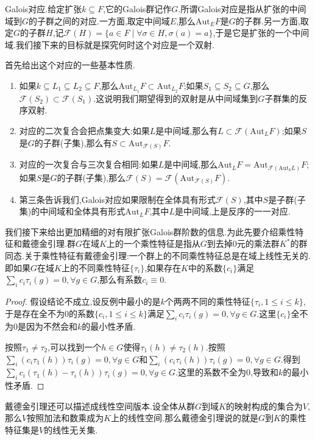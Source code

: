 Galois对应.给定扩张$k\subseteq F$,它的Galois群记作$G$.所谓Galois对应是指从扩张的中间域到$G$的子群之间的对应.一方面,取定中间域$E$,那么$\mathrm{Aut}_EF$是$G$的子群.另一方面,取定$G$的子群$H$,记$\mathscr{F}(H)=\{a\in F\mid\forall\sigma\in H,\sigma(a)=a\}$,于是它是扩张的一个中间域.我们接下来的目标就是探究何时这个对应是一个双射.

首先给出这个对应的一些基本性质.
\begin{enumerate}
	\item 如果$k\subseteq L_1\subseteq L_2\subseteq F$,那么$\mathrm{Aut}_{L_1}F\subset\mathrm{Aut}_{L_2}F$;如果$S_1\subseteq S_2\subseteq G$,那么$\mathscr{F}(S_2)\subset\mathscr{F}(S_1)$.这说明我们期望得到的双射是从中间域集到$G$子群集的反序双射.
	\item 对应的二次复合会把点集变大:如果$L$是中间域,那么有$L\subset\mathscr{F}(\mathrm{Aut}_LF)$;如果$S$是$G$的子群(子集),那么有$S\subset\mathrm{Aut}_{\mathscr{F}(S)}F$.
	\item 对应的一次复合与三次复合相同:如果$L$是中间域,那么$\mathrm{Aut}_LF=\mathrm{Aut}_{\mathscr{F}(\mathrm{Aut}_kL)}F$;如果$S$是$G$的子群(子集),那么$\mathscr{F}(S)=\mathscr{F}(\mathrm{Aut}_{\mathscr{F}(S)}F)$.
	\item 第三条告诉我们,Galois对应如果限制在全体具有形式$\mathscr{F}(S)$,其中$S$是子群(子集)的中间域和全体具有形式$\mathrm{Aut}_LF$,其中$L$是中间域,上是反序的一一对应.
\end{enumerate}

我们接下来给出更加精细的对有限扩张Galois群阶数的信息.为此先要介绍乘性特征和戴德金引理.群$G$在域$K$上的一个乘性特征是指从$G$到去掉0元的乘法群$K^*$的群同态.关于乘性特征有戴德金引理:一个群上的不同乘性特征总是在域上线性无关的.即如果$G$在域$K$上的不同乘性特征$\{\tau_i\}$,如果存在$K$中的系数$\{c_i\}$满足$\sum_i c_i\tau_i(g)=0,\forall g\in G$,那么有系数$c_i\equiv0$.
\begin{proof}
	
	假设结论不成立,设反例中最小的是$k$个两两不同的乘性特征$\{\tau_i,1\le i\le k\}$,于是存在全不为0的系数$\{c_i,1\le i\le k\}$满足$\sum_ic_i\tau_i(g)=0,\forall g\in G$.这里$\{c_i\}$全不为0是因为不然会和$k$的最小性矛盾.
	
	按照$\tau_1\not=\tau_2$,可以找到一个$h\in G$使得$\tau_1(h)\not=\tau_2(h)$.按照$\sum_i(c_i\tau_1(h))\tau_i(g)=0,\forall g\in G$和$\sum_i(c_i\tau_i(h))\tau_i(g)=0,\forall g\in G$.得到$\sum_ic_i(\tau_1(h)-\tau_i(h))\tau_i(g)=0,\forall g\in G$.这里的系数不全为0,导致和$k$的最小性矛盾.
\end{proof}

戴德金引理还可以描述成线性空间版本.设全体从群$G$到域$K$的映射构成的集合为$V$,那么$V$按照加法和数乘成为$K$上的线性空间.那么戴德金引理说的就是$G$到$K$的乘性特征集是$V$的线性无关集.

